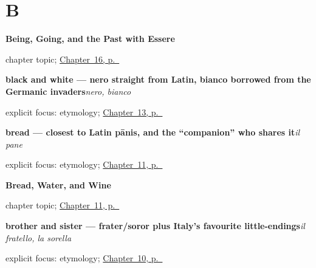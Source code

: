 \section*{B}

\noindent\begin{minipage}[t]{\linewidth}
\raggedright
\textbf{Being, Going, and the Past with Essere}\par
\footnotesize chapter topic; \hyperref[ch:it-essere-andare-past]{Chapter~16, p.~\pageref*{ch:it-essere-andare-past}}
\end{minipage}\par\smallskip

\noindent\begin{minipage}[t]{\linewidth}
\raggedright
\textbf{black and white — nero straight from Latin, bianco borrowed from the Germanic invaders}\enspace\emph{nero, bianco}\par
\footnotesize explicit focus: etymology; \hyperref[ch:it-colours]{Chapter~13, p.~\pageref*{ch:it-colours}}
\end{minipage}\par\smallskip

\noindent\begin{minipage}[t]{\linewidth}
\raggedright
\textbf{bread — closest to Latin pānis, and the \textquotedblleft{}companion\textquotedblright{} who shares it}\enspace\emph{il pane}\par
\footnotesize explicit focus: etymology; \hyperref[ch:it-bread-water-wine]{Chapter~11, p.~\pageref*{ch:it-bread-water-wine}}
\end{minipage}\par\smallskip

\noindent\begin{minipage}[t]{\linewidth}
\raggedright
\textbf{Bread, Water, and Wine}\par
\footnotesize chapter topic; \hyperref[ch:it-bread-water-wine]{Chapter~11, p.~\pageref*{ch:it-bread-water-wine}}
\end{minipage}\par\smallskip

\noindent\begin{minipage}[t]{\linewidth}
\raggedright
\textbf{brother and sister — frater/soror plus Italy's favourite little-endings}\enspace\emph{il fratello, la sorella}\par
\footnotesize explicit focus: etymology; \hyperref[ch:it-family]{Chapter~10, p.~\pageref*{ch:it-family}}
\end{minipage}\par\smallskip

